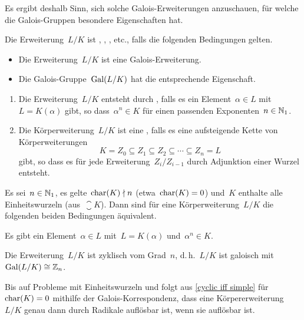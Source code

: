 Es ergibt deshalb Sinn, sich solche Galois-Erweiterungen anzuschauen, für welche die Galois-Gruppen besondere Eigenschaften hat.

\begin{definition}
  Die Erweiterung~$L/K$ ist , , , etc., falls die folgenden Bedingungen gelten.
  \begin{itemize}
    \item
      Die Erweiterung~$L/K$ ist eine Galois-Erweiterung.
    \item
      Die Galois-Gruppe~$\operatorname{Gal}(L/K)$ hat die entsprechende Eigenschaft.
  \end{itemize}
\end{definition}

\begin{definition}
  \leavevmode
  \begin{enumerate}
    \item
      Die Erweiterung~$L/K$ entsteht durch , falls es ein Element~$\alpha \in L$ mit~$L = K(\alpha)$ gibt, so dass~$\alpha^n \in K$ für einen passenden Exponenten~$n \in \mathbb{N}_1$.
    \item
      Die Körperweiterung~$L/K$ ist eine , falls es eine aufsteigende Kette von Körperweiterungen
      \[
        K = Z_0 \subseteq Z_1 \subseteq Z_2 \subseteq \dotsb \subseteq Z_n = L
      \]
      gibt, so dass es für jede Erweiterung~$Z_i / Z_{i-1}$ durch Adjunktion einer Wurzel entsteht.
  \end{enumerate}
\end{definition}

\begin{proposition}
  \label{cyclic iff simple}
  Es sei~$n \in \mathbb{N}_1$, es gelte~$\operatorname{char}(K) \nmid n$ (etwa~$\operatorname{char}(K) = 0$) und~$K$ enthalte alle~ Einheitswurzeln (aus~$\closure{K}$).
  Dann sind für eine Körperweiterung~$L/K$ die folgenden beiden Bedingungen äquivalent.
  \begin{equivlist}
    \item
      Es gibt ein Element~$\alpha \in L$ mit~$L = K(\alpha)$ und~$\alpha^n \in K$.
    \item
      Die Erweiterung~$L/K$ ist zyklisch vom Grad~$n$, d.\,h.~$L/K$ ist galoisch mit~$\operatorname{Gal}(L/K) \cong \mathbb{Z}_n$.
  \end{equivlist}
\end{proposition}

Bis auf Probleme mit Einheitswurzeln und folgt aus \cref{cyclic iff simple} für~$\operatorname{char}(K) = 0$ mithilfe der Galois-Korrespondenz, dass eine Körpererweiterung~$L/K$ genau dann durch Radikale auflösbar ist, wenn sie auflösbar ist.


